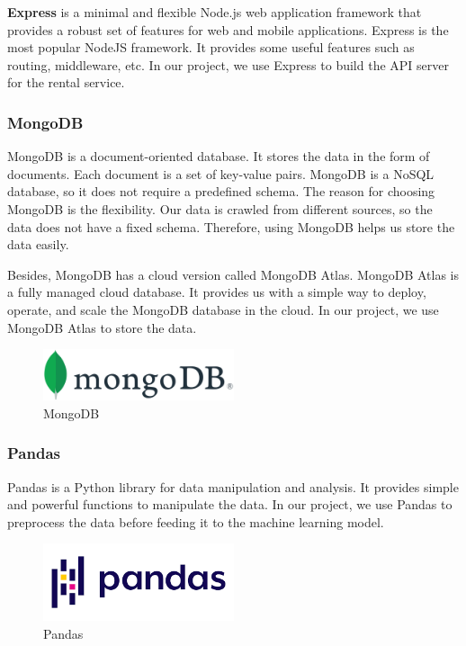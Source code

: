 \textbf{Express} is a minimal and flexible Node.js web application framework that provides a robust set of features for web and mobile applications. Express is the most popular NodeJS framework. It provides some useful features such as routing, middleware, etc. In our project, we use Express to build the API server for the rental service.

\subsubsection{MongoDB}
MongoDB is a document-oriented database. It stores the data in the form of documents. Each document is a set of key-value pairs. MongoDB is a NoSQL database, so it does not require a predefined schema. The reason for choosing MongoDB is the flexibility. Our data is crawled from different sources, so the data does not have a fixed schema. Therefore, using MongoDB helps us store the data easily.

Besides, MongoDB has a cloud version called MongoDB Atlas. MongoDB Atlas is a fully managed cloud database. It provides us with a simple way to deploy, operate, and scale the MongoDB database in the cloud. In our project, we use MongoDB Atlas to store the data.

\begin{figure}[ht]
    \centering
    \includegraphics[width=0.5\textwidth]{../Images/8.Technology_Stack/mongodb_logo.png}
    \caption{MongoDB}
    \label{fig:mongodb}
\end{figure}


\subsubsection{Pandas}
Pandas is a Python library for data manipulation and analysis. It provides simple and powerful functions to manipulate the data. In our project, we use Pandas to preprocess the data before feeding it to the machine learning model.

\begin{figure}[ht]
    \centering
    \includegraphics[width=0.5\textwidth]{../Images/8.Technology_Stack/pandas_logo.png}
    \caption{Pandas}
    \label{fig:pandas} 
\end{figure}

